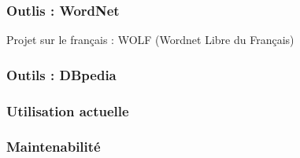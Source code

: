 \begin{frame}
  \frametitle{Outlis : WordNet}
  Projet sur le français : WOLF (Wordnet Libre du Français) 
\end{frame}

\begin{frame}
  \frametitle{Outils : DBpedia}
\end{frame}

\begin{frame}
  \frametitle{Utilisation actuelle}
\end{frame}

\begin{frame}
  \frametitle{Maintenabilité}
\end{frame}

